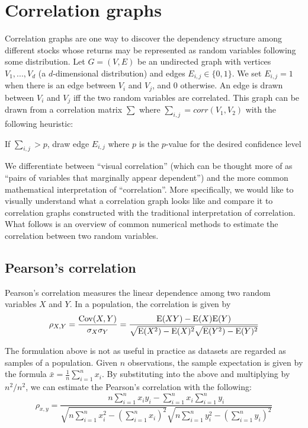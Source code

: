 \section{Correlation graphs}
\label{sec:intro:correlation}

Correlation graphs are one way to discover the dependency structure among different stocks whose returns may be represented as random variables following some distribution. Let $G=(V,E)$ be an undirected graph with vertices $V_{1},...,V_{d}$ (a $d$-dimensional distribution) and edges $E_{i,j}\in\{0,1\}$. We set $E_{i,j}=1$ when there is an edge between $V_i$ and $V_j$, and 0 otherwise. An edge is drawn between $V_i$ and $V_j$ iff the two random variables are correlated. This graph can be drawn from a correlation matrix $\sum$ where $\sum_{i,j}=corr(V_1,V_2)$ with the following heuristic:\\

\begin{algorithm}
	If $\sum_{i,j}>p$, draw edge $E_{i,j}$ where $p$ is the $p$-value for the desired confidence level
\end{algorithm}

We differentiate between ``visual correlation'' (which can be thought more of as ``pairs of variables that marginally appear dependent'') and the more common mathematical interpretation of ``correlation''. More specifically, we would like to visually understand what a correlation graph looks like and compare it to correlation graphs constructed with the traditional interpretation of correlation. What follows is an overview of common numerical methods to estimate the correlation between two random variables.

\subsection{Pearson's correlation}

Pearson's correlation measures the linear dependence among two random variables $X$ and $Y$. In a population, the correlation is given by
$$\rho_{X,Y}=\frac{\mathrm{Cov}(X,Y)}{\sigma_X \sigma_Y} = \frac{\mathrm{E}(XY)-\mathrm{E}(X)\mathrm{E}(Y)}{\sqrt{\mathrm{E}(X^2)-\mathrm{E}(X)^2} \sqrt{\mathrm{E}(Y^2)-\mathrm{E}(Y)^2}}$$ 

The formulation above is not as useful in practice as datasets are regarded as samples of a population. Given $n$ observations, the sample expectation is given by the formula  $\bar{x}=\frac{1}{n}\sum\limits_{i=1}^{n}x_i$. By substituting into the above and multiplying by $n^2/n^2$, we can estimate the Pearson's correlation with the following:
$$\rho_{x,y}=
\frac{n \sum\limits_{i=1}^{n} x_i y_i - \sum\limits_{i=1}^{n} x_i \sum\limits_{i=1}^{n} y_i}
{\sqrt{n\sum\limits_{i=1}^{n} x_i^2-\left(\sum\limits_{i=1}^{n} x_i\right)^2} 
\sqrt{n\sum\limits_{i=1}^{n} y_i^2-\left(\sum\limits_{i=1}^{n} y_i\right)^2}}$$ 

